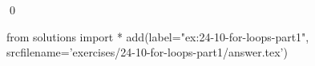 
\begin{ex}
  \label{ex:24-10-for-loops-part1}
  
  \qed
\end{ex}
\begin{python0}
from solutions import *
add(label="ex:24-10-for-loops-part1",
    srcfilename='exercises/24-10-for-loops-part1/answer.tex')
\end{python0}
